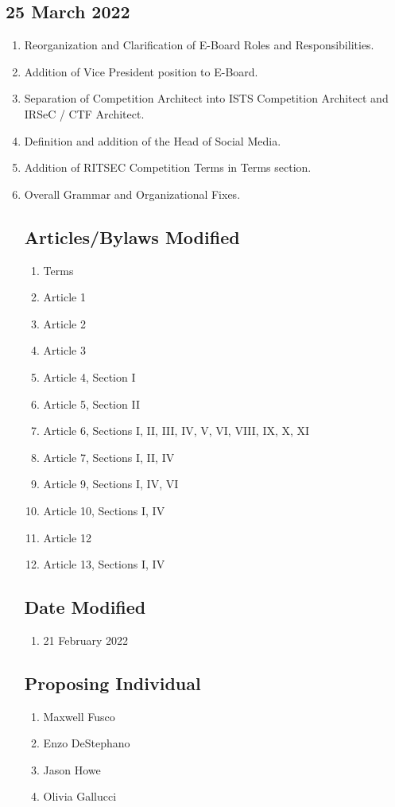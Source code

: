   \subsection{25 March 2022}
    \begin{enumerate}
      \item Reorganization and Clarification of E-Board Roles and Responsibilities. 
      \item Addition of Vice President position to E-Board. 
      \item Separation of Competition Architect into ISTS Competition Architect and IRSeC / CTF Architect.
      \item Definition and addition of the Head of Social Media.
      \item Addition of RITSEC Competition Terms in Terms section.
      \item Overall Grammar and Organizational Fixes.
  
        \subsection{Articles/Bylaws Modified}
        \begin{enumerate}
          \item Terms
          \item Article 1
          \item Article 2
          \item Article 3
          \item Article 4, Section I
          \item Article 5, Section II
          \item Article 6, Sections I, II, III, IV, V, VI, VIII, IX, X, XI
          \item Article 7, Sections I, II, IV
          \item Article 9, Sections I, IV, VI
          \item Article 10, Sections I, IV
          \item Article 12
          \item Article 13, Sections I, IV
        \end{enumerate} 
  
        \subsection{Date Modified}
        \begin{enumerate}
          \item 21 February 2022
        \end{enumerate}
  
        \subsection{Proposing Individual}
        \begin{enumerate}
          \item Maxwell Fusco
          \item Enzo DeStephano
          \item Jason Howe
          \item Olivia Gallucci
        \end{enumerate}
    \end{enumerate}
    
